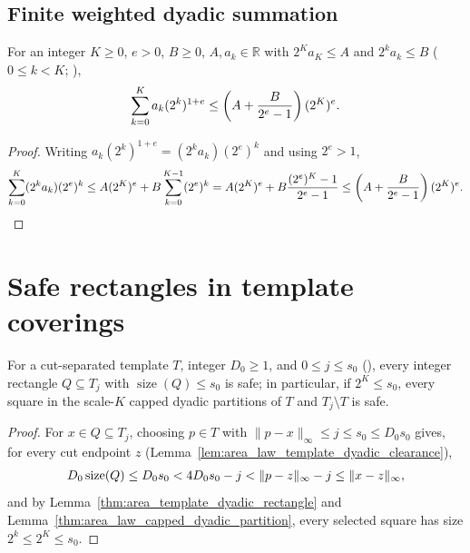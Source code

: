 \subsection{Finite weighted dyadic summation}

\begin{lemma}
    \label{thm:area_law_weighted_dyadic_sum}
    \leanok
    For an integer $K\ge0$, $e>0$, $B\ge0$, $A,a_k\in\mathbb R$ with $2^K a_K\le A$ and $2^k a_k\le B$ ($0\le k<K$; \cite[Lemma~9.4]{OpenAI2026AreaLaw}),
    \begin{align}
        \sum_{k=0}^{K} a_k(2^k)^{1+e}
        \le \left(A+\frac{B}{2^e-1}\right)(2^K)^e. \notag
    \end{align}
\end{lemma}
\begin{proof}\leanok
    Writing $a_k(2^k)^{1+e}=(2^ka_k)(2^e)^k$ and using $2^e>1$,
    \begin{align}
        \sum_{k=0}^K(2^ka_k)(2^e)^k
        \le A(2^K)^e + B\sum_{k=0}^{K-1}(2^e)^k
        =A(2^K)^e + B\frac{(2^e)^K-1}{2^e-1}
        \le\left(A+\frac{B}{2^e-1}\right)(2^K)^e. \notag
    \end{align}
\end{proof}

\section{Safe rectangles in template coverings}

\begin{lemma}
    \label{thm:area_template_safe_rectangles}
    \leanok
    For a cut-separated template $T$, integer $D_0\ge1$, and $0\le j\le s_0$ (\cite[Lemma~9.4]{OpenAI2026AreaLaw}), every integer rectangle $Q\subseteq T_j$ with $\operatorname{size}(Q)\le s_0$ is safe; in particular, if $2^K\le s_0$, every square in the scale-$K$ capped dyadic partitions of $T$ and $T_j\setminus T$ is safe.
\end{lemma}
\begin{proof}\leanok
    For $x\in Q\subseteq T_j$, choosing $p\in T$ with $\|p-x\|_\infty\le j\le s_0\le D_0s_0$ gives, for every cut endpoint $z$ (Lemma~\ref{lem:area_law_template_dyadic_clearance}),
    \begin{align}
        D_0\operatorname{size}(Q)\le D_0s_0 < 4D_0s_0-j < \|p-z\|_\infty-j \le \|x-z\|_\infty, \notag
    \end{align}
    and by Lemma~\ref{thm:area_template_dyadic_rectangle} and Lemma~\ref{thm:area_law_capped_dyadic_partition}, every selected square has size $2^k\le2^K\le s_0$.
\end{proof}

